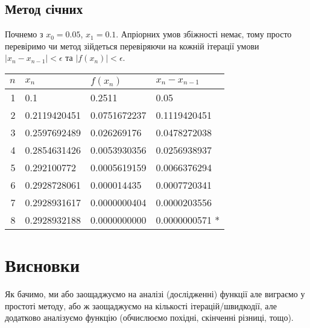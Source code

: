\subsection{Метод січних}

Почнемо з $x_0 = 0.05$, $x_1 = 0.1$. Апріорних умов збіжності немає, тому просто перевіримо чи метод зійдеться перевіряючи на кожній ітерації умови $|x_n - x_{n-1}| < \epsilon$ та $|f(x_n)| < \epsilon$.
\begin{table}[H]
    \centering
    \begin{tabular}{|r|l|l|l|}
        \hline
        $n$ & $x_n$ & $f(x_n)$ & $x_n - x_{n-1}$ \\ \hline
        1 & 0.1          & 0.2511       & 0.05           \\
        2 & 0.2119420451 & 0.0751672237 & 0.1119420451   \\
        3 & 0.2597692489 & 0.026269176  & 0.0478272038   \\
        4 & 0.2854631426 & 0.0053930356 & 0.0256938937   \\
        5 & 0.292100772  & 0.0005619159 & 0.0066376294   \\
        6 & 0.2928728061 & 0.000014435  & 0.0007720341   \\
        7 & 0.2928931617 & 0.0000000404 & 0.0000203556   \\
        8 & 0.2928932188 & 0.0000000000 & 0.0000000571 * \\ \hline
    \end{tabular}
\end{table}

\section{Висновки}

Як бачимо, ми або заощаджуємо на аналізі (дослідженні) функції але виграємо у простоті методу, або ж заощаджуємо на кількості ітерацій/швидкодії, але додатково аналізуємо функцію (обчислюємо похідні, скінченні різниці, тощо).



